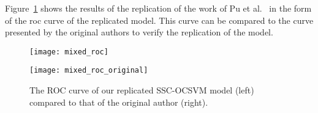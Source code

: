 %
Figure~\ref{fig:pu_rep} shows the results of the replication of the work of Pu
et al.~\cite{Pu} in the form of the \gls{roc} curve of the replicated model.
This curve can be compared to the curve presented by the original authors to
verify the replication of the model.

\begin{figure}[htbp]
    \centering
    \begin{minipage}[h]{0.5\textwidth}
        \centering
        \texttt{[image: mixed\_roc]}
    \end{minipage}\hfill
    \begin{minipage}[h]{0.5\textwidth}
        \centering
        \texttt{[image: mixed\_roc\_original]}
    \end{minipage}
    \caption[Pu et al.\ replication ROC curve]{The ROC curve of our replicated SSC-OCSVM model (left) compared to that of the original author (right).\label{fig:pu_rep}}
\end{figure}

